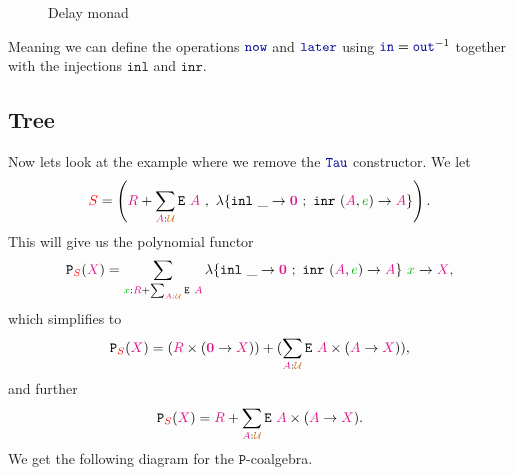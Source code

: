 \documentclass[twoside,11pt,openright]{report}
\theoremstyle{plain} %
\theoremstyle{definition}
\theoremstyle{remark}
\newcommand*{\term}[1]{\textcolor{green!70!black}{#1}} %
\newcommand*{\type}[1]{\textcolor{magenta!90!black}{#1}}
\newcommand*{\container}[1]{\textcolor{red}{#1}}
\newcommand*{\universe}[1]{\textcolor{orange!80!black}{#1}}
\newcommand*{\empt}{\type{\textbf{0}}}
\newcommand*{\function}[1]{\textcolor{blue!60!black}{\ensuremath{\mathtt{#1}}}}
\newcommand*{\typeformer}[1]{\ensuremath{\mathtt{#1}}}
\newcommand*{\functor}[1]{\ensuremath{\mathbf{\mathtt{#1}}}}
\begin{document}
\begin{figure}[h]
  \centering
  \caption{Delay monad}
\end{figure}
\noindent Meaning we can define the operations \(\function{now}\) and \(\function{later}\) using \(\function{in} = \function{out}^{-1}\) together with the injections \(\mathtt{inl}\) and \(\mathtt{inr}\). 

\subsection{Tree}
Now lets look at the example where we remove the \(\function{Tau}\) constructor. We let
\begin{equation}
  \container{S} = \left(\type{R} + \sum_{\type{A} : \universe{\mathcal{U}}} \typeformer{E}~\type{A}~,~\lambda \{ \texttt{inl}~\_ \rightarrow \empt ~;~ \texttt{inr}~(\type{A},\term{e}) \rightarrow \type{A} \} \right).
\end{equation}
This will give us the polynomial functor
\begin{equation}
  \functor{P}_{\container{S}}(\type{X}) = \sum_{\term{x} : \type{R} + \sum_{\type{A} : \universe{\mathcal{U}}} \typeformer{E}~\type{A}} \lambda \{ \texttt{inl}~\_ \rightarrow \empt ~;~ \texttt{inr}~(\type{A},\term{e}) \rightarrow \type{A} \}~\term{x} \rightarrow \type{X},
\end{equation}
which simplifies to
\begin{equation}
  \functor{P}_{\container{S}}(\type{X}) = (\type{R} \times (\empt \rightarrow \type{X})) + (\sum_{\type{A} : \universe{\mathcal{U}}} \typeformer{E}~\type{A} \times (\type{A} \rightarrow \type{X})),
\end{equation}
and further
\begin{equation}
  \functor{P}_{\container{S}}(\type{X}) = \type{R} + \sum_{\type{A} : \universe{\mathcal{U}}} \typeformer{E}~\type{A} \times (\type{A} \rightarrow \type{X}).
\end{equation}
We get the following diagram for the \(\functor{P}\)-coalgebra.
\end{document}
